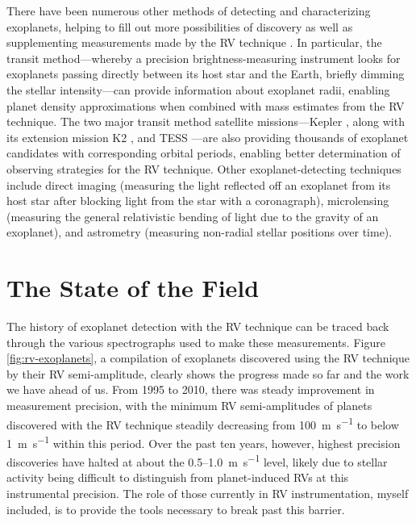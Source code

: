 There have been numerous other methods of detecting and characterizing exoplanets, helping to fill out more possibilities of discovery as well as supplementing measurements made by the RV technique \citep{fischer_exoplanet_2014}. In particular, the transit method---whereby a precision brightness-measuring instrument looks for exoplanets passing directly between its host star and the Earth, briefly dimming the stellar intensity---can provide information about exoplanet radii, enabling planet density approximations when combined with mass estimates from the RV technique. The two major transit method satellite missions---Kepler \citep{borucki_kepler_2010}, along with its extension mission K2 \citep{howell_k2_2014}, and TESS \citep{ricker_transiting_2014}---are also providing thousands of exoplanet candidates with corresponding orbital periods, enabling better determination of observing strategies for the RV technique. Other exoplanet-detecting techniques include direct imaging (measuring the light reflected off an exoplanet from its host star after blocking light from the star with a coronagraph), microlensing (measuring the general relativistic bending of light due to the gravity of an exoplanet), and astrometry (measuring non-radial stellar positions over time).

\section{The State of the Field}

The history of exoplanet detection with the RV technique can be traced back through the various spectrographs used to make these measurements. Figure \ref{fig:rv-exoplanets}, a compilation of exoplanets discovered using the RV technique by their RV semi-amplitude, clearly shows the progress made so far and the work we have ahead of us. From 1995 to 2010, there was steady improvement in measurement precision, with the minimum RV semi-amplitudes of planets discovered with the RV technique steadily decreasing from 100~\si{\meter\per\second} to below 1~\si{\meter\per\second} within this period. Over the past ten years, however, highest precision discoveries have halted at about the 0.5--1.0~\si{\meter\per\second} level, likely due to stellar activity being difficult to distinguish from planet-induced RVs at this instrumental precision. The role of those currently in RV instrumentation, myself included, is to provide the tools necessary to break past this barrier.

